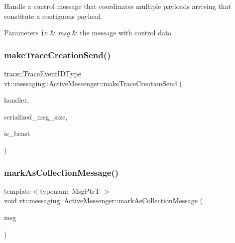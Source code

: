Handle a control message that coordinates multiple payloads arriving that constitute a contiguous payload. 


\begin{DoxyParams}[1]{Parameters}
\mbox{\tt in}  & {\em msg} & the message with control data \\
\hline
\end{DoxyParams}
\mbox{\label{structvt_1_1messaging_1_1_active_messenger_a73a4b3a082031fdd676ae7670f13de3d}} 
\subsubsection{\texorpdfstring{make\+Trace\+Creation\+Send()}{makeTraceCreationSend()}}
{\footnotesize\ttfamily \hyperlink{namespacevt_1_1trace_a64a7185f3e102df8d8258f263ccd1582}{trace\+::\+Trace\+Event\+I\+D\+Type} vt\+::messaging\+::\+Active\+Messenger\+::make\+Trace\+Creation\+Send (\begin{DoxyParamCaption}\item[{\hyperlink{namespacevt_af64846b57dfcaf104da3ef6967917573}{Handler\+Type} const}]{handler,  }\item[{\hyperlink{namespacevt_aab8d55968084610ce3b17057981e9300}{Byte\+Type}}]{serialized\+\_\+msg\+\_\+size,  }\item[{bool}]{is\+\_\+bcast }\end{DoxyParamCaption})}

\mbox{\label{structvt_1_1messaging_1_1_active_messenger_a0587ea992b0f1b06da38d52a3851aae5}} 
\subsubsection{\texorpdfstring{mark\+As\+Collection\+Message()}{markAsCollectionMessage()}}
{\footnotesize\ttfamily template$<$typename Msg\+PtrT $>$ \\
void vt\+::messaging\+::\+Active\+Messenger\+::mark\+As\+Collection\+Message (\begin{DoxyParamCaption}\item[{Msg\+PtrT const}]{msg }\end{DoxyParamCaption})}



